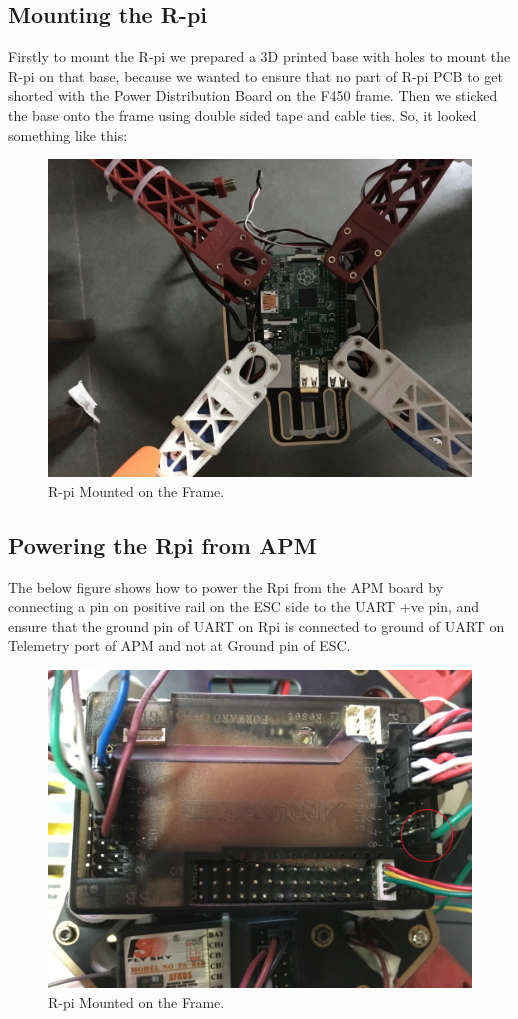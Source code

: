 \documentclass[11pt,a4paper]{article}
\begin{document}
	 \subsection{Mounting the R-pi}
	 	Firstly to mount the R-pi we prepared a 3D printed base with holes to mount the R-pi on that base, because we wanted to ensure that no part of R-pi PCB to get shorted with the Power Distribution Board on the F450 frame. Then we sticked the base onto the frame using double sided tape and cable ties. So, it looked something like this:
	 	\begin{figure}[H]
	 	
	 	\centering
		\includegraphics[scale=0.10]{Rpi}
	 	\caption{R-pi Mounted on the Frame.}
\end{figure}
	 	\subsection{Powering the Rpi from APM}
	 	The below figure shows how to power the Rpi from the APM board by connecting a pin on positive rail on the ESC side to the UART +ve pin, and ensure that the ground pin of UART on Rpi is connected to ground of UART on Telemetry port of APM and not at Ground pin of ESC.
	 	\begin{figure}[H]
	 	\centering
		\includegraphics[scale=0.10]{apm}
	 	\caption{R-pi Mounted on the Frame.}
\end{figure}
\end{document}
